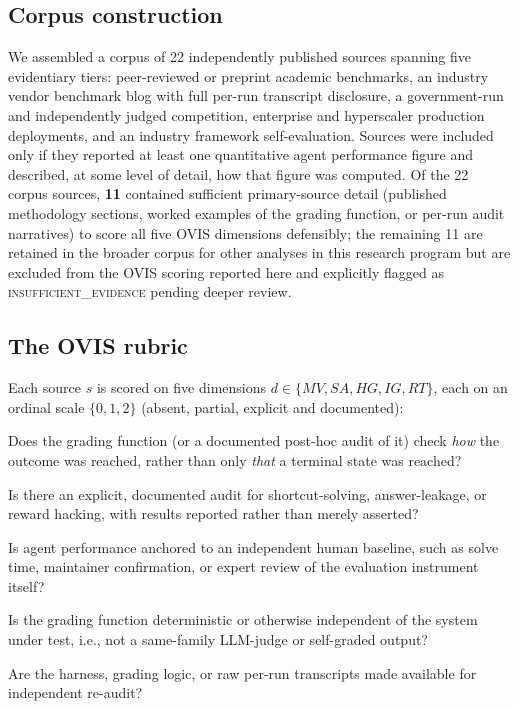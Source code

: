 \documentclass[10pt,twocolumn]{article}
\begin{document}
\subsection{Corpus construction}
We assembled a corpus of 22 independently published sources spanning
five evidentiary tiers: peer-reviewed or preprint academic benchmarks,
an industry vendor benchmark blog with full per-run transcript
disclosure, a government-run and independently judged competition,
enterprise and hyperscaler production deployments, and an industry
framework self-evaluation. Sources were included only if they reported
at least one quantitative agent performance figure and described, at
some level of detail, how that figure was computed. Of the 22 corpus
sources, \textbf{11} contained sufficient primary-source detail
(published methodology sections, worked examples of the grading
function, or per-run audit narratives) to score all five OVIS dimensions
defensibly; the remaining 11 are retained in the broader corpus for
other analyses in this research program but are excluded from the OVIS
scoring reported here and explicitly flagged as
\textsc{insufficient\_evidence} pending deeper review.

\subsection{The OVIS rubric}
\label{sec:rubric}
Each source $s$ is scored on five dimensions $d \in \{MV, SA, HG, IG,
RT\}$, each on an ordinal scale $\{0,1,2\}$ (absent, partial, explicit
and documented):

\begin{description}[leftmargin=1.4em,itemsep=1pt,topsep=2pt,style=nextline]
\item[\textbf{MV --- Method Verification}] Does the grading function (or
a documented post-hoc audit of it) check \emph{how} the outcome was
reached, rather than only \emph{that} a terminal state was reached?
\item[\textbf{SA --- Shortcut/Contamination Audit}] Is there an explicit,
documented audit for shortcut-solving, answer-leakage, or reward
hacking, with results reported rather than merely asserted?
\item[\textbf{HG --- Human Ground-Truth Anchor}] Is agent performance
anchored to an independent human baseline, such as solve time,
maintainer confirmation, or expert review of the evaluation instrument
itself?
\item[\textbf{IG --- Grader Independence}] Is the grading function
deterministic or otherwise independent of the system under test, i.e.,
not a same-family LLM-judge or self-graded output?
\item[\textbf{RT --- Reproducibility/Transparency}] Are the harness,
grading logic, or raw per-run transcripts made available for independent
re-audit?
\end{description}
\end{document}
